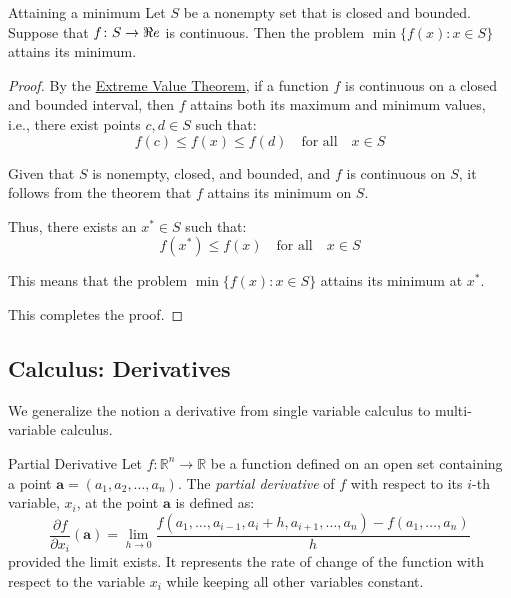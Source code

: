 \begin{center}
\end{center}


\begin{theorem}{Attaining a minimum}{}
Let $S$ be a nonempty set that is closed and bounded.  Suppose that $f \colon S \to \Re e$ is continuous.  Then the problem $\min\{ f(x) : x \in S\}$ attains its minimum.
\end{theorem}
\begin{proof}
By the \href{https://en.wikipedia.org/wiki/Extreme_value_theorem}{Extreme Value Theorem}, if a function \( f \) is continuous on a closed and bounded interval, then \( f \) attains both its maximum and minimum values, i.e., there exist points \( c, d \in S \) such that:
\[
f(c) \leq f(x) \leq f(d) \quad \text{for all} \quad x \in S
\]

Given that \( S \) is nonempty, closed, and bounded, and \( f \) is continuous on \( S \), it follows from the theorem that \( f \) attains its minimum on \( S \).

Thus, there exists an \( x^* \in S \) such that:
\[
f(x^*) \leq f(x) \quad \text{for all} \quad x \in S
\]

This means that the problem \( \min\{ f(x) : x \in S\} \) attains its minimum at \( x^* \).

This completes the proof.
\end{proof}

\subsection{Calculus: Derivatives}
We generalize the notion a derivative from single variable calculus to multi-variable calculus.

\begin{definition}{Partial Derivative}{}
Let \( f: \mathbb{R}^n \rightarrow \mathbb{R} \) be a function defined on an open set containing a point \( \mathbf{a} = (a_1, a_2, \dots, a_n) \). The \emph{partial derivative} of \( f \) with respect to its \( i \)-th variable, \( x_i \), at the point \( \mathbf{a} \) is defined as:
\[
\frac{\partial f}{\partial x_i} (\mathbf{a}) = \lim_{{h} \to 0} \frac{f(a_1, \dots, a_{i-1}, a_i + h, a_{i+1}, \dots, a_n) - f(a_1, \dots, a_n)}{h}
\]
provided the limit exists. It represents the rate of change of the function with respect to the variable \( x_i \) while keeping all other variables constant.
\end{definition}


